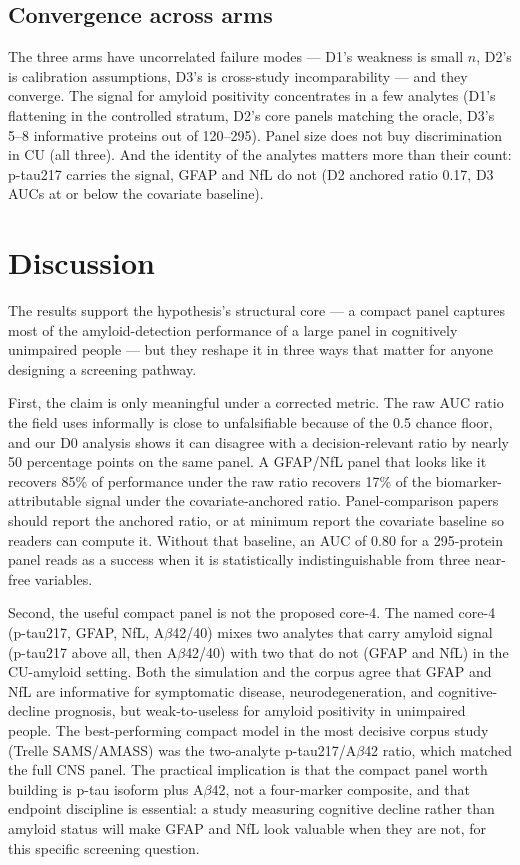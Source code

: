 \documentclass{article}
\begin{document}
\subsection{Convergence across arms}

The three arms have uncorrelated failure modes --- D1's weakness is small $n$,
D2's is calibration assumptions, D3's is cross-study incomparability --- and
they converge. The signal for amyloid positivity concentrates in a few analytes
(D1's flattening in the controlled stratum, D2's core panels matching the
oracle, D3's 5--8 informative proteins out of 120--295). Panel size does not buy
discrimination in CU (all three). And the identity of the analytes matters more
than their count: p-tau217 carries the signal, GFAP and NfL do not (D2 anchored
ratio 0.17, D3 AUCs at or below the covariate baseline).

\section{Discussion}

The results support the hypothesis's structural core --- a compact panel
captures most of the amyloid-detection performance of a large panel in
cognitively unimpaired people --- but they reshape it in three ways that matter
for anyone designing a screening pathway.

First, the claim is only meaningful under a corrected metric. The raw AUC ratio
the field uses informally is close to unfalsifiable because of the 0.5 chance
floor, and our D0 analysis shows it can disagree with a decision-relevant ratio
by nearly 50 percentage points on the same panel. A GFAP/NfL panel that looks
like it recovers 85\% of performance under the raw ratio recovers 17\% of the
biomarker-attributable signal under the covariate-anchored ratio.
Panel-comparison papers should report the anchored ratio, or at minimum report
the covariate baseline so readers can compute it. Without that baseline, an AUC
of 0.80 for a 295-protein panel reads as a success when it is statistically
indistinguishable from three near-free variables.

Second, the useful compact panel is not the proposed core-4. The named core-4
(p-tau217, GFAP, NfL, A$\beta$42/40) mixes two analytes that carry amyloid
signal (p-tau217 above all, then A$\beta$42/40) with two that do not (GFAP and
NfL) in the CU-amyloid setting. Both the simulation and the corpus agree that
GFAP and NfL are informative for symptomatic disease, neurodegeneration, and
cognitive-decline prognosis, but weak-to-useless for amyloid positivity in
unimpaired people. The best-performing compact model in the most decisive
corpus study (Trelle SAMS/AMASS) was the two-analyte p-tau217/A$\beta$42 ratio,
which matched the full CNS panel. The practical implication is that the compact
panel worth building is p-tau isoform plus A$\beta$42, not a four-marker
composite, and that endpoint discipline is essential: a study measuring
cognitive decline rather than amyloid status will make GFAP and NfL look
valuable when they are not, for this specific screening question.
\end{document}
